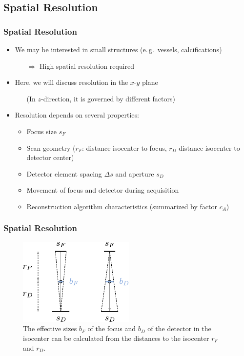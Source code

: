 \subsection{Spatial Resolution}

\begin{frame}
	\frametitle{Spatial Resolution}

	\begin{itemize}
		\setlength\itemsep{0.3cm}
		\item We may be interested in small structures (e.\,g.~vessels, calcifications)
		      \begin{itemize}
			      \item[$\Rightarrow$] High spatial resolution required
		      \end{itemize}
		\item Here, we will discuss resolution in the $x$-$y$ plane
		      \begin{itemize}
			      \item[ ] (In $z$-direction, it is governed by different factors)
		      \end{itemize}
		\item Resolution depends on several properties:
		      \begin{itemize}
			      \item Focus size $s_F$
			      \item Scan geometry ($r_F$: distance isocenter to focus, $r_D$ distance isocenter to detector center)
			      \item Detector element spacing $\Delta s$ and aperture $s_D$
			      \item Movement of focus and detector during acquisition
			      \item Reconstruction algorithm characteristics (summarized by factor $c_A$)
		      \end{itemize}
	\end{itemize}

\end{frame}

\begin{frame}
	\frametitle{Spatial Resolution}

	\begin{figure}
		\begin{center}
			\includegraphics[width=0.5\linewidth]{images/resolution_3}
		\end{center}
		\caption{The effective sizes $b_F$ of the focus and $b_D$ of the detector in the isocenter can be calculated from the distances to the isocenter $r_F$ and $r_D$.}
		\label{fig:ct_resolution_3}
	\end{figure}

\end{frame}



